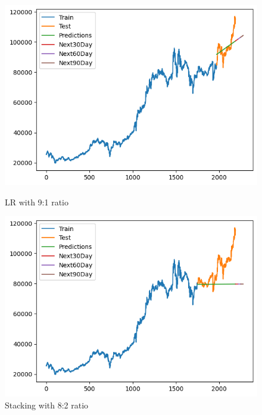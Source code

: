 \documentclass[conference]{IEEEtran}
\begin{document}
\begin{figure}[H]
    \centering
    \begin{minipage}{0.24\textwidth}
        \centering
        \includegraphics[width=\textwidth]{Figure/FPT/linear91.png}
        \caption{LR with 9:1 ratio}
        \label{fig:image1}
    \end{minipage}
    \hfill
    \begin{minipage}{0.24\textwidth}
        \centering
        \includegraphics[width=\textwidth]{Figure/FPT/stacking82.png}
        \caption{Stacking with 8:2 ratio}
        \label{fig:image2}
    \end{minipage}
\end{figure}
\end{document}
